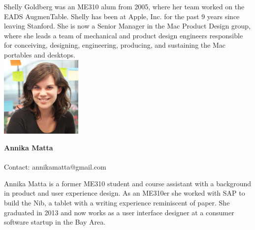 Shelly Goldberg was an ME310 alum from 2005, where her team worked on the EADS AugmenTable.  Shelly has been at Apple, Inc. for the past 9 years since leaving Stanford.  She is now a Senior Manager in the Mac Product Design group, where she leads a team of mechanical and product design engineers responsible for conceiving, designing, engineering, producing, and sustaining the Mac portables and desktops.  
\\

\noindent \includegraphics[width=40mm]{images/annika.jpg}
\parbox[b]{0.6\textwidth}{\textbf{Annika Matta}\\ \\
Contact: annikamatta@gmail.com  \\
}

Annika Matta is a former ME310 student and course assistant with a background in product and user experience design. As an ME310er she worked with SAP to build the Nib, a tablet with a writing experience reminiscent of paper. She graduated in 2013 and now works as a user interface designer at a consumer software startup in the Bay Area.
\\ 

